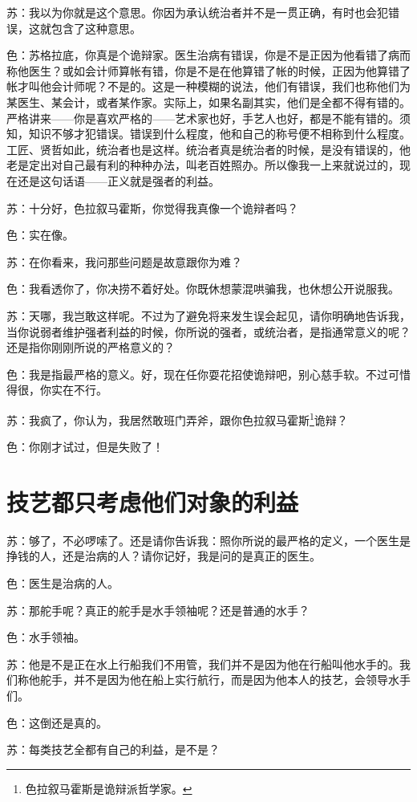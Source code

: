 \documentclass[11pt,oneside]{book}
\begin{document}
\begin{common-format}
苏：我以为你就是这个意思。你因为承认统治者并不是一贯正确，有时也会犯错误，这就包含了这种意思。

色：苏格拉底，你真是个诡辩家。医生治病有错误，你是不是正因为他看错了病而称他医生？或如会计师算帐有错，你是不是在他算错了帐的时候，正因为他算错了帐才叫他会计师呢？不是的。这是一种模糊的说法，他们有错误，我们也称他们为某医生、某会计，或者某作家。实际上，如果名副其实，他们是全都不得有错的。严格讲来——你是喜欢严格的——艺术家也好，手艺人也好，都是不能有错的。须知，知识不够才犯错误。错误到什么程度，他和自己的称号便不相称到什么程度。工匠、贤哲如此，统治者也是这样。统治者真是统治者的时候，是没有错误的，他老是定出对自己最有利的种种办法，叫老百姓照办。所以像我一上来就说过的，现在还是这句话语——正义就是强者的利益。

苏：十分好，色拉叙马霍斯，你觉得我真像一个诡辩者吗？

色：实在像。

苏：在你看来，我问那些问题是故意跟你为难？

色：我看透你了，你决捞不着好处。你既休想蒙混哄骗我，也休想公开说服我。

苏：天哪，我岂敢这样呢。不过为了避免将来发生误会起见，请你明确地告诉我，当你说弱者维护强者利益的时候，你所说的强者，或统治者，是指通常意义的呢？还是指你刚刚所说的严格意义的？

色：我是指最严格的意义。好，现在任你耍花招使诡辩吧，别心慈手软。不过可惜得很，你实在不行。

苏：我疯了，你认为，我居然敢班门弄斧，跟你色拉叙马霍斯\footnote{色拉叙马霍斯是诡辩派哲学家。}诡辩？

色：你刚才试过，但是失败了！


\section{技艺都只考虑他们对象的利益}
苏：够了，不必啰嗦了。还是请你告诉我：照你所说的最严格的定义，一个医生是挣钱的人，还是治病的人？请你记好，我是问的是真正的医生。

色：医生是治病的人。

苏：那舵手呢？真正的舵手是水手领袖呢？还是普通的水手？

色：水手领袖。

苏：他是不是正在水上行船我们不用管，我们并不是因为他在行船叫他水手的。我们称他舵手，并不是因为他在船上实行航行，而是因为他本人的技艺，会领导水手们。

色：这倒还是真的。

苏：每类技艺全都有自己的利益，是不是？


\end{common-format}
\end{document}
